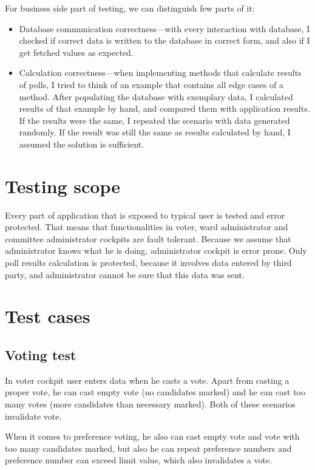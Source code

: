\documentclass[a4paper,twoside,12pt]{book}
\begin{document}
        For business side part of testing, we can distinguish few parts of it:
        \begin{itemize}
          \item Database communication correctness---with every interaction with database, I checked if correct data is written to the database in correct form,
          and also if I get fetched values as expected.
          \item Calculation correctness---when implementing methods that calculate results of polls, I tried to think of an example that contains all edge cases of a method.
          After populating the database with exemplary data, I calculated results of that example by hand, and compared them with application results.
          If the results were the same, I repeated the scenario with data generated randomly. 
          If the result was still the same as results calculated by hand, I assumed the solution is sufficient.
        \end{itemize}

  \section{Testing scope}
    Every part of application that is exposed to typical user is tested and error protected. 
    That means that functionalities in voter, ward administrator and committee administrator cockpits are fault tolerant.
    Because we assume that administrator knows what he is doing, administrator cockpit is error prone. 
    Only poll results calculation is protected, because it involves data entered by third party, and administrator cannot be sure that this data was sent.

  \section{Test cases}
    \subsection{Voting test}
      In voter cockpit user enters data when he casts a vote. Apart from casting a proper vote, he can cast empty vote (no candidates marked) and
      he can cast too many votes (more candidates than necessary marked). Both of these scenarios invalidate vote.

      When it comes to preference voting, he also can cast empty vote and vote with too many candidates marked, but also he can repeat preference numbers and
      preference number can exceed limit value, which also invalidates a vote.
\end{document}
